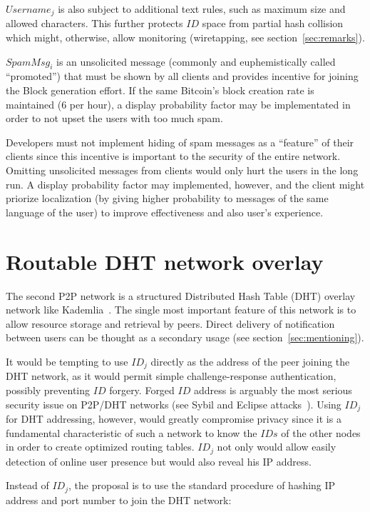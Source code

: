 \documentclass[a4paper,10pt]{article}
\begin{document}
$Username_j$ is also subject to additional text rules, such as maximum size and allowed characters. This further protects $ID$ space from partial hash collision which might, otherwise, allow monitoring (wiretapping, see section~\ref{sec:remarks}).

$SpamMsg_i$ is an unsolicited message (commonly and euphemistically called ``promoted'') that must be shown by all clients and provides incentive for joining the Block generation effort. If the same Bitcoin's block creation rate is maintained (6 per hour), a display probability factor may be implementated in order to not upset the users with too much spam. 

Developers must not implement hiding of spam messages as a ``feature'' of their clients since this incentive is important to the security of the entire network. Omitting unsolicited messages from clients would only hurt the users in the long run. A display probability factor may implemented, however, and the client might priorize localization (by giving higher probability to messages of the same language of the user) to improve effectiveness and also user's experience.

\section{Routable DHT network overlay}
\label{sec:dhtnet}

The second P2P network is a structured Distributed Hash Table (DHT) overlay network like Kademlia~\cite{maymounkov2002kademlia}. The single most important feature of this network is to allow resource storage and retrieval by peers. Direct delivery of notification between users can be thought as a secondary usage (see section~\ref{sec:mentioning}).

It would be tempting to use $ID_j$ directly as the address of the peer joining the DHT network, as it would permit simple challenge-response authentication, possibly preventing $ID$ forgery. Forged $ID$ address is arguably the most serious security issue on P2P/DHT networks (see Sybil and Eclipse attacks~\cite{wang2006attacks,yang2012survey}). Using $ID_j$ for DHT addressing, however, would greatly compromise privacy since it is a fundamental characteristic of such a network to know the $IDs$ of the other nodes in order to create optimized routing tables. $ID_j$ not only would allow easily detection of online user presence but would also reveal his IP address.

Instead of $ID_j$, the proposal is to use the standard procedure of hashing IP address and port number to join the DHT network:
\end{document}
